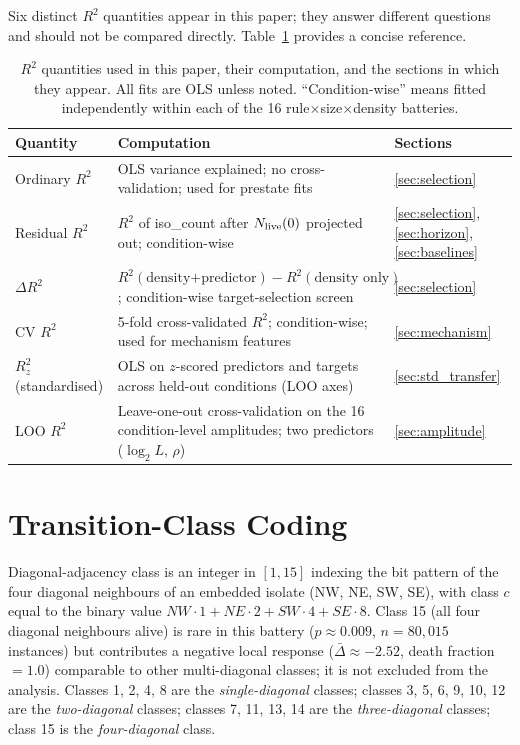 \documentclass[aip,cha,preprint,nofootinbib]{revtex4-2}
\begin{document}
Six distinct $R^2$ quantities appear in this paper; they answer different
questions and should not be compared directly.
Table~\ref{tab:r2notation} provides a concise reference.

\begin{table}[htbp]
\centering
\caption{$R^2$ quantities used in this paper, their computation, and the
sections in which they appear.
All fits are OLS unless noted.
``Condition-wise'' means fitted independently within each of the
16 rule$\times$size$\times$density batteries.}
\label{tab:r2notation}
\begin{tabular}{p{3.0cm}p{5.5cm}l}
\toprule
Quantity & Computation & Sections \\
\midrule
Ordinary $R^2$ &
  OLS variance explained; no cross-validation; used for prestate fits &
  \ref{sec:selection} \\[4pt]
Residual $R^2$ &
  $R^2$ of iso\_count after $N_{\rm live}(0)$ projected out;
  condition-wise &
  \ref{sec:selection}, \ref{sec:horizon},
  \ref{sec:baselines} \\[4pt]
$\Delta R^2$ &
  $R^2(\text{density+predictor}) - R^2(\text{density only})$;
  condition-wise target-selection screen &
  \ref{sec:selection} \\[4pt]
CV $R^2$ &
  5-fold cross-validated $R^2$; condition-wise;
  used for mechanism features &
  \ref{sec:mechanism} \\[4pt]
$R^2_z$ (standardised) &
  OLS on $z$-scored predictors and targets across
  held-out conditions (LOO axes) &
  \ref{sec:std_transfer} \\[4pt]
LOO $R^2$ &
  Leave-one-out cross-validation on the 16 condition-level
  amplitudes; two predictors ($\log_2 L$, $\rho$) &
  \ref{sec:amplitude} \\
\bottomrule
\end{tabular}
\end{table}

\section{Transition-Class Coding}
\label{app:classes}

Diagonal-adjacency class is an integer in $[1, 15]$ indexing the bit
pattern of the four diagonal neighbours of an embedded isolate
(NW, NE, SW, SE), with class $c$ equal to the binary value
$\textit{NW}\cdot 1 + \textit{NE}\cdot 2 + \textit{SW}\cdot 4 +
\textit{SE}\cdot 8$.
Class 15 (all four diagonal neighbours alive) is rare in this battery
($p \approx 0.009$, $n = 80{,}015$ instances) but contributes a negative
local response ($\bar\Delta \approx -2.52$, death fraction $= 1.0$)
comparable to other multi-diagonal classes; it is not excluded from
the analysis.
Classes 1, 2, 4, 8 are the \emph{single-diagonal} classes;
classes 3, 5, 6, 9, 10, 12 are the \emph{two-diagonal} classes;
classes 7, 11, 13, 14 are the \emph{three-diagonal} classes;
class 15 is the \emph{four-diagonal} class.


\end{document}
